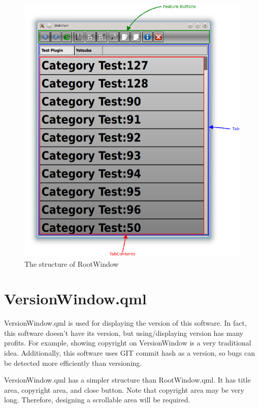 \documentclass[titlepage]{article}
\begin{document}
            \begin{figure}[htb]
                \begin{center}
                    \includegraphics[scale=0.6]{img/RootWindow_structure.png}
                \end{center}
                \caption{The structure of RootWindow \label{RootWindow_fig}}
            \end{figure}
        
    \section{VersionWindow.qml}
        VersionWindow.qml is used for displaying the version of this software. In fact, this software doesn't have its version, 
        but using/displaying version has many profits. For example, showing copyright on VersionWindow is a very traditional idea.
        Additionally, this software uses GIT commit hash as a version, so bugs can be detected more efficiently than versioning.
        
        VersionWindow.qml has a simpler structure than RootWindow.qml. It has title area, copyright area, and close button.
        Note that copyright area may be very long. Therefore, designing a scrollable area will be required.
        
\end{document}
